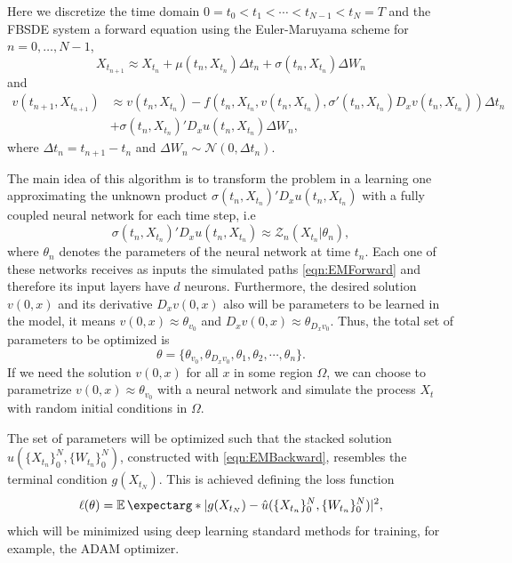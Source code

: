 Here we discretize the time domain $0=t_0<t_1<\cdots <t_{N-1}<t_N=T$ and the FBSDE system a  forward equation using the Euler-Maruyama scheme for $n=0,\ldots,N-1$,
\begin{equation}
	\label{eqn:EMForward}
	X_{t_{n+1}} \approx X_{t_n} +\mu\left(t_n, X_{t_n}\right) \Delta t_n+\sigma\left(t_n, X_{t_n}\right) \Delta W_n
\end{equation}
and 
\begin{equation}
	\label{eqn:EMBackward}
	\begin{aligned}
		 v\left(t_{n+1}, X_{t_{n+1}}\right)
		&\approx  v\left(t_n, X_{t_n}\right) -f\left(t_n, X_{t_n}, v\left(t_n, X_{t_n}\right), \sigma'\left(t_n, X_{t_n}\right) D_x v\left(t_n, X_{t_n}\right)\right) \Delta t_n \\
		& +\sigma\left(t_n, X_{t_n}\right)'D_x u\left(t_n, X_{t_n}\right)  \Delta W_n,
	\end{aligned}
\end{equation}
where $\Delta t_n=t_{n+1}-t_{n}$ and $\Delta W_n\sim \mathcal{N}(0,\Delta t_n)$.

The main idea of this algorithm is to transform the problem in a learning one approximating the unknown product $\sigma\left(t_n, X_{t_n}\right)'D_x u\left(t_n, X_{t_n}\right)$ with a fully coupled neural network for each time step, i.e
\begin{equation}
	\sigma\left(t_n, X_{t_n}\right)'D_x u\left(t_n, X_{t_n}\right) \approx \mathcal{Z}_n(X_{t_n}|\theta_n),
\end{equation}
where $\theta_n$ denotes the parameters of the neural network at time $t_n$. Each one of these networks receives as inputs the simulated paths \eqref{eqn:EMForward} and therefore its input layers have $d$ neurons.   Furthermore, the desired solution $v(0,x)$ and its derivative $D_x v(0,x)$ also will be parameters to be learned in the model, it means $v(0,x)\approx \theta_{v_0}$ and $D_x v(0,x)\approx \theta_{D_x v_0}$. Thus, the total set of parameters to be optimized is 
\begin{equation}
	\theta=\{\theta_{v_0}, \theta_{D_x v_0},\theta_1,\theta_2,\cdots,\theta_n \}.
\end{equation}
If we need the solution $v(0,x)$ for all $x$ in some region $\Omega$, we can choose to parametrize $v(0,x)\approx \theta_{v_0}$ with a neural network and simulate the process $X_t$ with random initial conditions in $\Omega$.

The set of parameters will be optimized such that the stacked solution $\hat{u}(\{X_{t_n}\}_{0}^{N},\{W_{t_n}\}_{0}^{N})$, constructed with \eqref{eqn:EMBackward}, resembles the terminal condition $g(X_{t_N})$. This is achieved defining the loss function 
\begin{equation}
	\label{eqn:lossDeepBSDE}
	\ell(\theta)=\expect*{|g(X_{t_N})-\hat{u}(\{X_{t_n}\}_{0}^N,\{W_{t_n}\}_{0}^N)|^2},
\end{equation}
which will be minimized using deep learning standard methods for training, for example, the ADAM optimizer.

